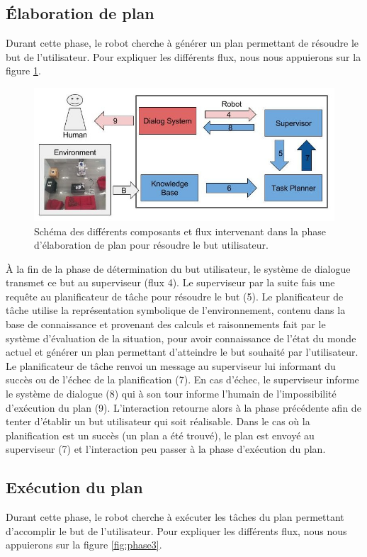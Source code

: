 \documentclass[a4paper,11pt,twoside]{StyleThese}
\begin{document}
\subsection{Élaboration de plan}
\label{sec:phase2}
Durant cette phase, le robot cherche à générer un plan permettant de résoudre le but de l'utilisateur. Pour expliquer les différents flux, nous nous appuierons sur la figure \ref{fig:phase2}.

\begin{figure}[ht!]
 \centering
  \includegraphics[width=0.99\linewidth]{./img/phase2color.jpg} 
  \caption {Schéma des différents composants et flux intervenant dans la phase d'élaboration de plan pour résoudre le but utilisateur.}
  \label{fig:phase2}
\end{figure}

À la fin de la phase de détermination du but utilisateur, le système de dialogue transmet ce but au superviseur (flux 4). Le superviseur par la suite fais une requête au planificateur de tâche pour résoudre le but (5). Le planificateur de tâche utilise la représentation symbolique de l'environnement, contenu dans la base de connaissance et provenant des calculs et raisonnements fait par le système d'évaluation de la situation, pour avoir connaissance de l'état du monde actuel et générer un plan permettant d'atteindre le but souhaité par l'utilisateur. Le planificateur de tâche renvoi un message au superviseur lui informant du succès ou de l'échec de la planification (7). En cas d'échec, le superviseur informe le système de dialogue (8) qui à son tour informe l'humain de l'impossibilité d'exécution du plan (9).
L'interaction retourne alors à la phase précédente afin de tenter d'établir un but utilisateur qui soit réalisable. 
Dans le cas où la planification est un succès (un plan a été trouvé), le plan est envoyé au superviseur (7) et l'interaction peu passer à la phase d'exécution du plan.


\subsection{Exécution du plan}
\label{sec:phase3}
Durant cette phase, le robot cherche à exécuter les tâches du plan permettant d'accomplir le but de l'utilisateur. Pour expliquer les différents flux, nous nous appuierons sur la figure \ref{fig:phase3}.
\end{document}

